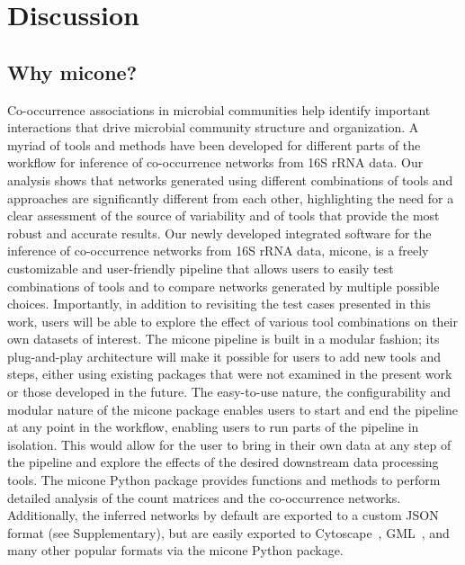 
\section*{Discussion}

  \subsection*{Why \ac{micone}?}

  Co-occurrence associations in microbial communities help identify important interactions that drive microbial community structure and organization.
  A myriad of tools and methods have been developed for different parts of the workflow for inference of co-occurrence networks from 16S rRNA data.
  Our analysis shows that networks generated using different combinations of tools and approaches are significantly different from each other, highlighting the need for a clear assessment of the source of variability and of tools that provide the most robust and accurate results.
  Our newly developed integrated software for the inference of co-occurrence networks from 16S rRNA data, \ac{micone}, is a freely customizable and user-friendly pipeline that allows users to easily test combinations of tools and to compare networks generated by multiple possible choices.
  Importantly, in addition to revisiting the test cases presented in this work, users will be able to explore the effect of various tool combinations on their own datasets of interest.
  The \ac{micone} pipeline is built in a modular fashion; its plug-and-play architecture will make it possible for users to add new tools and steps, either using existing packages that were not examined in the present work or those developed in the future.
  The easy-to-use nature, the configurability and modular nature of the \ac{micone} package enables users to start and end the pipeline at any point in the workflow, enabling users to run parts of the pipeline in isolation.
  This would allow for the user to bring in their own data at any step of the pipeline and explore the effects of the desired downstream data processing tools.
  The \ac{micone} Python package provides functions and methods to perform detailed analysis of the count matrices and the co-occurrence networks.
  Additionally, the inferred networks by default are exported to a custom JSON format (see Supplementary), but are easily exported to Cytoscape~\cite{shannonCytoscapeSoftwareEnvironment2003}, GML~\cite{himsoltGMLPortableGraph2010}, and many other popular formats via the \ac{micone} Python package.

